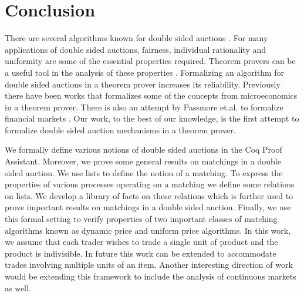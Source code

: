 \documentclass[a4paper,UKenglish,cleveref, autoref]{lipics-v2019}
\begin{document}
\section{Conclusion}\label{sec:conclusion}
There are several algorithms known for double sided auctions \cite{Deshmukh:2002:TCD}. For many applications of double sided auctions, fairness, individual rationality and uniformity are some of the essential properties required. Theorem provers can be a useful tool in the analysis of these properties \cite{oai:HAL:hal-01673716v1}. Formalizing an algorithm for double sided auctions in a theorem prover increases its reliability. Previously there have been works that formalizes some of the concepts from microeconomics \cite{toolbox,welfare} in a theorem prover. There is also an  attempt by Passmore et.al. to formalize financial markets \cite{PassmoreI17}. Our work, to the best of our knowledge, is the first attempt to formalize double sided auction mechanisms in a theorem prover.

We formally define various notions of double sided auctions in the Coq Proof Assistant.
Moreover, we prove some general results on matchings in a double sided auction. We use
lists to define the notion of a matching. To express the properties
of various processes operating on a matching we define some relations on lists. We develop a library of facts on these relations which is further used to prove
important results on matchings in a double sided auction. Finally, we use this formal setting
to verify properties of two important classes of matching algorithms known as dynamic price
and uniform price algorithms. In this work, we assume that each trader wishes
to trade a single unit of product and the product is indivisible. In future this work can be
extended to accommodate trades involving multiple units of an item. Another interesting direction of work
would be extending this framework to include the analysis of continuous markets as well.


\end{document}
